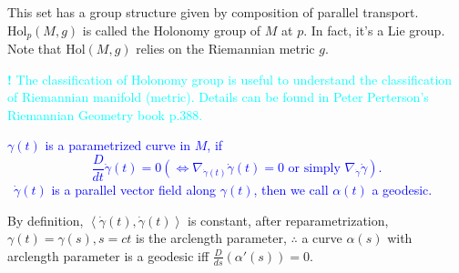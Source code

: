 This set has a group structure given by composition of parallel transport.
\(\mathrm{Hol}_p(M,g)\) is called the Holonomy group of \(M\) at \(p\).
In fact, it's a Lie group. Note that \(\mathrm{Hol}(M,g)\) relies on 
the Riemannian metric \(g\).\

\textcolor{cyan}{
    {\Large \textbf{!}} The classification of Holonomy group is useful 
    to understand the classification of Riemannian manifold (metric). 
    Details can be found in Peter Perterson's Riemannian Geometry
    book p.388.
}
\textcolor{blue}{
    \begin{definition}[Geodesics]
        \(\gamma(t)\) is a parametrized curve in \(M\), if
        \[
            \frac{D}{dt}\dot{\gamma}(t)=0\left(\Longleftrightarrow
            \nabla_{\dot{\gamma}(t)}\dot{\gamma}(t)=0
            \text{ or simply }\nabla_{\dot{\gamma}}\dot{\gamma}\right).    
        \]
        \ie\ \(\dot{\gamma}(t)\) is a parallel vector field along
        \(\gamma(t)\), then we call \(\alpha(t)\) a geodesic. 
    \end{definition}
}
\begin{remark}
    By definition, \(\left\langle\dot{\gamma}(t),\dot{\gamma}(t)
    \right\rangle\) is constant, after reparametrization,
    \(\gamma(t)=\gamma(s),s=ct\) is the arclength parameter,
    \(\therefore\) a curve \(\alpha(s)\) with arclength parameter
    is a geodesic iff \(\frac{D}{ds}\left(\alpha'(s)\right)=0\).
\end{remark}
